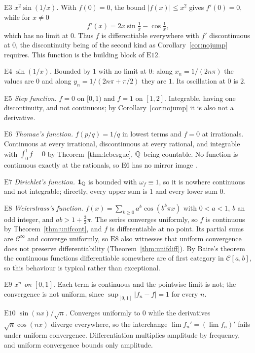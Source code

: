 \smallskip\noindent
$\mathrm{E}3$ \emph{$x^2\sin(1/x)$.} With $f(0)=0$, the bound $|f(x)|\le x^2$
gives $f'(0)=0$, while for $x\ne0$
\[ f'(x) = 2x\sin\tfrac1x - \cos\tfrac1x, \]
which has no limit at $0$. Thus $f$ is differentiable everywhere with $f'$
discontinuous at $0$, the discontinuity being of the second kind as
Corollary~\ref{cor:nojump} requires. This function is the building block of
$\mathrm{E}12$.

\smallskip\noindent
$\mathrm{E}4$ \emph{$\sin(1/x)$.} Bounded by $1$ with no limit at $0$: along
$x_n=1/(2n\pi)$ the values are $0$ and along $y_n = 1/(2n\pi+\pi/2)$ they are
$1$. Its oscillation at $0$ is $2$.

\smallskip\noindent
$\mathrm{E}5$ \emph{Step function.} $f=0$ on $[0,1)$ and $f=1$ on $[1,2]$.
Integrable, having one discontinuity, and not continuous; by
Corollary~\ref{cor:nojump} it is also not a derivative.

\smallskip\noindent
$\mathrm{E}6$ \emph{Thomae's function.} $f(p/q)=1/q$ in lowest terms and
$f=0$ at irrationals. Continuous at every irrational, discontinuous at every
rational, and integrable with $\int_0^1 f = 0$ by
Theorem~\ref{thm:lebesgue}, $\mathbb{Q}$ being countable. No function is continuous
exactly at the rationals, so $\mathrm{E}6$ has no mirror image
\cite[appendix to Chapter~4]{annotated}.

\smallskip\noindent
$\mathrm{E}7$ \emph{Dirichlet's function.} $\mathbf{1}_{\mathbb{Q}}$ is bounded with
$\omega_f\equiv1$, so it is nowhere continuous and not integrable; directly,
every upper sum is $1$ and every lower sum $0$.

\smallskip\noindent
$\mathrm{E}8$ \emph{Weierstrass's function.}
$f(x)=\sum_{k\ge0} a^k\cos(b^k\pi x)$ with $0<a<1$, $b$ an odd integer, and
$ab>1+\tfrac32\pi$. The series converges uniformly, so $f$ is continuous by
Theorem~\ref{thm:unifcont}, and $f$ is differentiable at no point. Its
partial sums are $\mathscr{C}^\infty$ and converge uniformly, so
$\mathrm{E}8$ also witnesses that uniform convergence does not preserve
differentiability (Theorem~\ref{thm:unifdiff}). By Baire's
theorem the continuous functions differentiable somewhere are of first
category in $\mathscr{C}[a,b]$, so this behaviour is typical rather than
exceptional.

\smallskip\noindent
$\mathrm{E}9$ \emph{$x^n$ on $[0,1]$.} Each term is continuous and the
pointwise limit is not; the convergence is not uniform, since
$\sup_{[0,1]}|f_n-f| = 1$ for every $n$.

\smallskip\noindent
$\mathrm{E}10$ \emph{$\sin(nx)/\sqrt n$.} Converges uniformly to $0$ while
the derivatives $\sqrt n\cos(nx)$ diverge everywhere, so the interchange
$\lim f_n' = (\lim f_n)'$ fails under uniform convergence. Differentiation
multiplies amplitude by frequency, and uniform convergence bounds only
amplitude.

